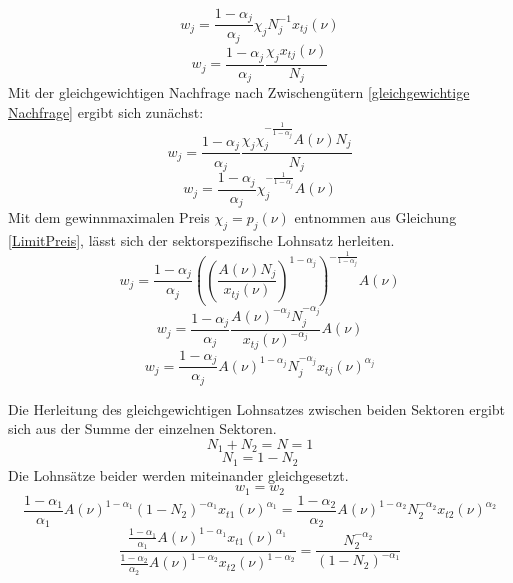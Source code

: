 \begin{equation*}
w_j=\frac{1-\alpha_j}{\alpha_j}\chi_jN_j^{-1}x_{tj}(\nu)
\end{equation*}
\begin{equation}
w_j=\frac{1-\alpha_j}{\alpha_j}\frac{\chi_jx_{tj}(\nu)}{N_j}
\end{equation}
Mit der gleichgewichtigen Nachfrage nach Zwischengütern \eqref{gleichgewichtige Nachfrage} ergibt sich zunächst:
\begin{equation}
w_j=\frac{1-\alpha_j}{\alpha_j}\frac{\chi_j\chi_j^{-\frac{1}{1-\alpha_j}}A(\nu)N_j}{N_j}
\end{equation}
\begin{equation}
w_j=\frac{1-\alpha_j}{\alpha_j} \chi_j^{-\frac{1}{1-\alpha_j}}A(\nu)
\end{equation}
Mit dem gewinnmaximalen Preis $\chi_j=p_j(\nu)$ entnommen aus Gleichung \eqref{LimitPreis}, lässt sich der sektorspezifische Lohnsatz herleiten. 
\begin{equation*}
w_j=\frac{1-\alpha_j}{\alpha_j} \left(\left(\frac{A(\nu)N_j}{x_{tj}(\nu)}\right)^{1-\alpha_j}\right)^{-\frac{1}{1-\alpha_j}}A(\nu)
\end{equation*}
\begin{equation*}
w_j=\frac{1-\alpha_j}{\alpha_j}\frac{A(\nu)^{-\alpha_j}N_j^{-\alpha_j}}{x_{tj}(\nu)^{-\alpha_j}}A(\nu)
\end{equation*}
\begin{equation}
\boxed{w_j=\frac{1-\alpha_j}{\alpha_j}A(\nu)^{1-\alpha_j}N_j^{-\alpha_j}x_{tj}(\nu)^{\alpha_j}}
\end{equation}

Die Herleitung des gleichgewichtigen Lohnsatzes zwischen beiden Sektoren ergibt sich aus der Summe der einzelnen Sektoren. 
\begin{equation}
N_1+N_{2}=N=1
\end{equation}
\vspace{-0.8cm}
\begin{equation}
N_1=1-N_{2}
\end{equation}
Die Lohnsätze beider werden miteinander gleichgesetzt.
\begin{equation}
w_1=w_{2}
\end{equation}
\begin{equation*}
\frac{1-\alpha_1}{\alpha_1}A(\nu)^{1-\alpha_1}(1-N_{2})^{-\alpha_1}x_{t1}(\nu)^{\alpha_1}=\frac{1-\alpha_{2}}{\alpha_{2}}A(\nu)^{1-\alpha_{2}}N_{2}^{-\alpha_{2}}x_{t2}(\nu)^{\alpha_{2}}
\end{equation*}
\begin{equation}
\boxed{\frac{\frac{1-\alpha_1}{\alpha_1}A(\nu)^{1-\alpha_1}x_{t1}(\nu)^{\alpha_1}}{\frac{1-\alpha_{2}}{\alpha_{2}}A(\nu)^{1-\alpha_{2}}x_{t2}(\nu)^{1-\alpha_{2}}}=\frac{N_{2}^{-\alpha_{2}}}{(1-N_{2})^{-\alpha_1}}}
\end{equation}



